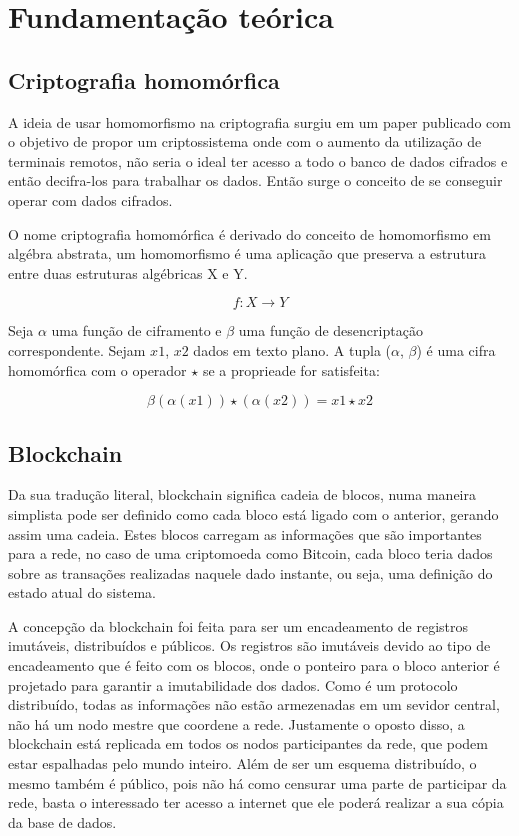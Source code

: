 \documentclass{ufsctex/ufsctex}
\begin{document}
\chapter{Fundamentação teórica}

\section{Criptografia homomórfica}

A ideia de usar homomorfismo na criptografia surgiu em um paper publicado
com o objetivo de propor um criptossistema onde com o aumento da utilização
de terminais remotos, não seria o ideal ter acesso a todo o banco de dados
cifrados e então decifra-los para trabalhar os dados. Então surge o conceito
de se conseguir operar com dados cifrados.\cite{homomorphic}

O nome criptografia homomórfica é derivado do conceito de homomorfismo em
algébra abstrata, um homomorfismo é uma aplicação que preserva a estrutura
entre duas estruturas algébricas X e Y.

\begin{equation}
{f} : X \longrightarrow Y
\end{equation}

Seja $\alpha$ uma função de ciframento e $\beta$ uma função de desencriptação
correspondente. Sejam $x1$, $x2$ dados em texto plano. A tupla ($\alpha$, $\beta$)
é uma cifra homomórfica com o operador $\star$ se a proprieade for satisfeita:

\begin{equation}
\beta (\alpha(x1)) \star (\alpha(x2)) = x1 \star x2
\end{equation}

\section{Blockchain}

Da sua tradução literal, blockchain significa cadeia de blocos, numa maneira
simplista pode ser definido como cada bloco está ligado com o anterior, gerando
assim uma cadeia. Estes blocos carregam as informações que são importantes para
a rede, no caso de uma criptomoeda como Bitcoin, cada bloco teria dados sobre
as transações realizadas naquele dado instante, ou seja, uma definição do estado
atual do sistema.

A concepção da blockchain foi feita para ser um encadeamento de registros imutáveis,
distribuídos e públicos. Os registros são imutáveis devido ao tipo de encadeamento
que é feito com os blocos, onde o ponteiro para o bloco anterior é projetado para
garantir a imutabilidade dos dados. Como é um protocolo distribuído, todas as
informações não estão armezenadas em um sevidor central, não há um nodo mestre que
coordene a rede. Justamente o oposto disso, a blockchain está replicada em todos os nodos
participantes da rede, que podem estar espalhadas pelo mundo inteiro. Além de ser um
esquema distribuído, o mesmo também é público, pois não há como censurar uma parte
de participar da rede, basta o interessado ter acesso a internet que ele poderá
realizar a sua cópia da base de dados.\cite{blockchain}
\end{document}
